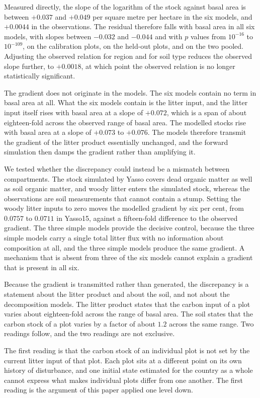 \documentclass[11pt]{article}
\begin{document}
Measured directly, the slope of the logarithm of the stock against basal area is
between $+0.037$ and $+0.049$ per square metre per hectare in the six models, and
$+0.0044$ in the observations. The residual therefore falls with basal area in all
six models, with slopes between $-0.032$ and $-0.044$ and with $p$ values from
$10^{-16}$ to $10^{-109}$, on the calibration plots, on the held-out plots, and on
the two pooled. Adjusting the observed relation for region and for soil type reduces
the observed slope further, to $+0.0018$, at which point the observed relation is no
longer statistically significant.

The gradient does not originate in the models. The six models contain no term in
basal area at all. What the six models contain is the litter input, and the litter
input itself rises with basal area at a slope of $+0.072$, which is a span of about
eighteen-fold across the observed range of basal area. The modelled stocks rise with
basal area at a slope of $+0.073$ to $+0.076$. The models therefore transmit the
gradient of the litter product essentially unchanged, and the forward simulation
then damps the gradient rather than amplifying it.

We tested whether the discrepancy could instead be a mismatch between compartments.
The stock simulated by Yasso covers dead organic matter as well as soil organic
matter, and woody litter enters the simulated stock, whereas the observations are
soil measurements that cannot contain a stump. Setting the woody litter inputs to
zero moves the modelled gradient by six per cent, from $0.0757$ to $0.0711$ in
Yasso15, against a fifteen-fold difference to the observed gradient. The three
simple models provide the decisive control, because the three simple models carry a
single total litter flux with no information about composition at all, and the three
simple models produce the same gradient. A mechanism that is absent from three of
the six models cannot explain a gradient that is present in all six.

Because the gradient is transmitted rather than generated, the discrepancy is a
statement about the litter product and about the soil, and not about the
decomposition models. The litter product states that the carbon input of a plot
varies about eighteen-fold across the range of basal area. The soil states that the
carbon stock of a plot varies by a factor of about $1.2$ across the same range. Two
readings follow, and the two readings are not exclusive.

The first reading is that the carbon stock of an individual plot is not set by the
current litter input of that plot. Each plot sits at a different point on its own
history of disturbance, and one initial state estimated for the country as a whole
cannot express what makes individual plots differ from one another. The first
reading is the argument of this paper applied one level down.
\end{document}
